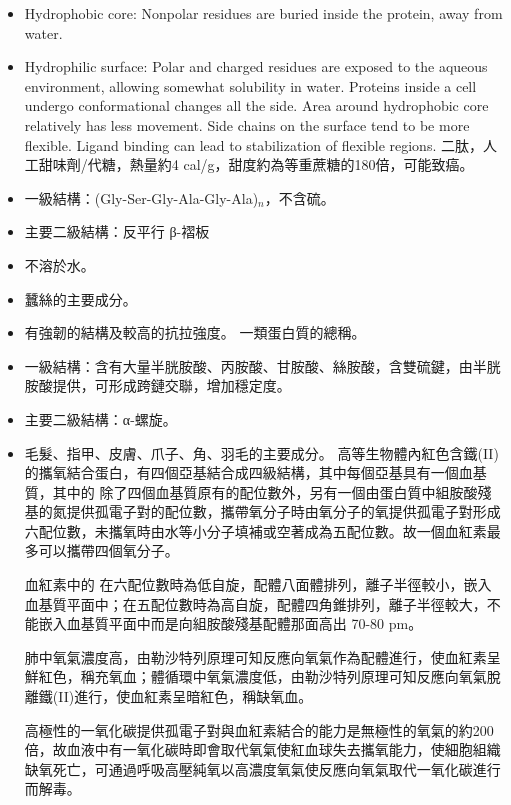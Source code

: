 \documentclass[a4paper,12pt]{report}
\begin{document}
\begin{itemize}
\begin{itemize}
\bit
\item Hydrophobic core: Nonpolar residues are buried inside the protein, away from water.
\item Hydrophilic surface: Polar and charged residues are exposed to the aqueous environment, allowing somewhat solubility in water.
\eit
{}
Proteins inside a cell undergo conformational changes all the side. Area around hydrophobic core relatively has less movement. Side chains on the surface tend to be more flexible. Ligand binding can lead to stabilization of flexible regions.
二肽，人工甜味劑/代糖，熱量約4 cal/g，甜度約為等重蔗糖的180倍，可能致癌。
\bit
\item 一級結構：(Gly-Ser-Gly-Ala-Gly-Ala)$_n$，不含硫。
\item 主要二級結構：反平行 β-褶板
\item 不溶於水。
\item 蠶絲的主要成分。
\item 有強韌的結構及較高的抗拉強度。
\eit
{}
一類蛋白質的總稱。
\bit
\item 一級結構：含有大量半胱胺酸、丙胺酸、甘胺酸、絲胺酸，含雙硫鍵，由半胱胺酸提供，可形成跨鏈交聯，增加穩定度。
\item 主要二級結構：α-螺旋。
\item 毛髮、指甲、皮膚、爪子、角、羽毛的主要成分。
\eit
{}
高等生物體內紅色含鐵(II)的攜氧結合蛋白，有四個亞基結合成四級結構，其中每個亞基具有一個血基質，其中的  除了四個血基質原有的配位數外，另有一個由蛋白質中組胺酸殘基的氮提供孤電子對的配位數，攜帶氧分子時由氧分子的氧提供孤電子對形成六配位數，未攜氧時由水等小分子填補或空著成為五配位數。故一個血紅素最多可以攜帶四個氧分子。

血紅素中的  在六配位數時為低自旋，配體八面體排列，離子半徑較小，嵌入血基質平面中；在五配位數時為高自旋，配體四角錐排列，離子半徑較大，不能嵌入血基質平面中而是向組胺酸殘基配體那面高出 70-80 pm。

肺中氧氣濃度高，由勒沙特列原理可知反應向氧氣作為配體進行，使血紅素呈鮮紅色，稱充氧血；體循環中氧氣濃度低，由勒沙特列原理可知反應向氧氣脫離鐵(II)進行，使血紅素呈暗紅色，稱缺氧血。

高極性的一氧化碳提供孤電子對與血紅素結合的能力是無極性的氧氣的約200倍，故血液中有一氧化碳時即會取代氧氣使紅血球失去攜氧能力，使細胞組織缺氧死亡，可通過呼吸高壓純氧以高濃度氧氣使反應向氧氣取代一氧化碳進行而解毒。


\end{itemize}
\end{itemize}
\end{document}
